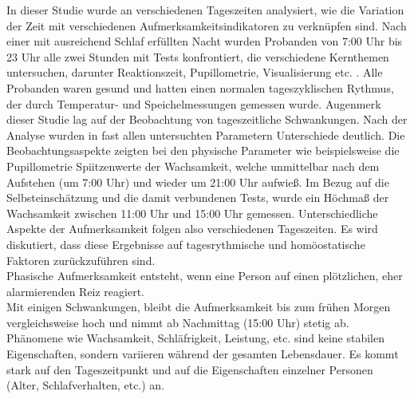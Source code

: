 In dieser Studie wurde an verschiedenen Tageszeiten analysiert, wie die Variation der Zeit mit verschiedenen Aufmerksamkeitsindikatoren zu verknüpfen sind. Nach einer mit ausreichend Schlaf erfüllten Nacht wurden Probanden von 7:00 Uhr bis 23 Uhr alle zwei Stunden mit Tests konfrontiert, die verschiedene Kernthemen untersuchen, darunter Reaktionszeit, Pupillometrie, Visualisierung etc. . Alle Probanden waren gesund und hatten einen normalen tageszyklischen Rythmus, der durch Temperatur- und Speichelmessungen gemessen wurde. Augenmerk dieser Studie lag auf der Beobachtung von tageszeitliche Schwankungen. Nach der Analyse wurden in fast allen untersuchten Parametern Unterschiede deutlich. Die Beobachtungsaspekte zeigten bei den physische Parameter wie beispielsweise die Pupillometrie Spiitzenwerte der Wachsamkeit, welche unmittelbar nach dem Aufstehen (um 7:00 Uhr) und wieder um 21:00 Uhr aufwieß. Im Bezug auf die Selbsteinschätzung und die damit verbundenen Tests, wurde ein Höchmaß der Wachsamkeit zwischen 11:00 Uhr und 15:00 Uhr gemessen. Unterschiedliche Aspekte der Aufmerksamkeit folgen also verschiedenen Tageszeiten. Es wird diskutiert, dass diese Ergebnisse auf tagesrythmische und homöostatische Faktoren zurückzuführen sind.\\
Phasische Aufmerksamkeit entsteht, wenn eine Person auf einen plötzlichen, eher alarmierenden Reiz reagiert.\\
Mit einigen Schwankungen, bleibt die Aufmerksamkeit bis zum frühen Morgen vergleichsweise hoch und nimmt ab Nachmittag (15:00 Uhr) stetig ab.\\
Phänomene wie Wachsamkeit, Schläfrigkeit, Leistung, etc. sind keine stabilen Eigenschaften, sondern variieren während der gesamten Lebensdauer. Es kommt stark auf den Tageszeitpunkt und auf die Eigenschaften einzelner Personen (Alter, Schlafverhalten, etc.) an.

